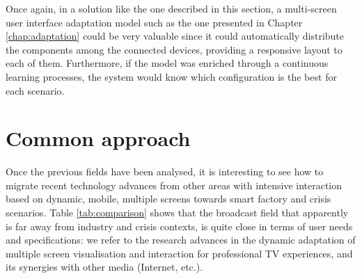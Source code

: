 Once again, in a solution like the one described in this section, a multi-screen user interface adaptation model such as the one presented in Chapter \ref{chap:adaptation} could be very valuable since it could automatically distribute the components among the connected devices, providing a responsive layout to each of them. Furthermore, if the model was enriched through a continuous learning processes, the system would know which configuration is the best for each scenario.  


\section{Common approach}

Once the previous fields have been analysed, it is interesting to see how to migrate recent technology advances from other areas with intensive interaction based on dynamic, mobile, multiple screens towards smart factory and crisis scenarios. Table \ref{tab:comparison} shows that the broadcast field that apparently is far away from industry and crisis contexts, is quite close in terms of user needs and specifications: we refer to the research advances in the dynamic adaptation of multiple screen visualisation and interaction for professional TV experiences, and its synergies with other media (Internet, etc.). 

